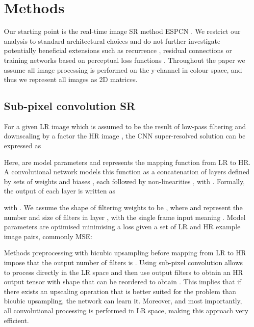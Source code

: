 \documentclass[10pt,twocolumn,letterpaper]{article}
\begin{document}
\section{Methods}

Our starting point is the real-time image \gls{SR} method ESPCN \cite{Shi2016}. We restrict our analysis to standard architectural choices and do not further investigate potentially beneficial extensions such as recurrence \cite{Kim2015a}, residual connections \cite{He2015, He2016} or training networks based on perceptual loss functions \cite{Johnson2016, Ledig2016, Bruna2016, Dosovitskiy2016}. Throughout the paper we assume all image processing is performed on the y-channel in colour space, and thus we represent all images as 2D matrices.

\subsection{Sub-pixel convolution SR}

For a given \gls{LR} image  which is assumed to be the result of low-pass filtering and downscaling by a factor  the \gls{HR} image , the \gls{CNN} super-resolved solution  can be expressed as 

Here,  are model parameters and  represents the mapping function from \gls{LR} to \gls{HR}. A convolutional network models this function as a concatenation of  layers defined by sets of weights and biases , each followed by non-linearities , with . Formally, the output of each layer is written as

with . We assume the shape of filtering weights to be , where  and  represent the number and size of filters in layer , with the single frame input meaning . Model parameters are optimised minimising a loss given a set of \gls{LR} and \gls{HR} example image pairs, commonly \gls{MSE}:


Methods preprocessing  with bicubic upsampling before mapping from \gls{LR} to \gls{HR} impose that the output number of filters is  \cite{Dong2015, Kappeler2016}. Using sub-pixel convolution allows to process  directly in the \gls{LR} space and then use  output filters to obtain an \gls{HR} output tensor with shape  that can be reordered to obtain  \cite{Shi2016}. This implies that if there exists an upscaling operation that is better suited for the problem than bicubic upsampling, the network can learn it. Moreover, and most importantly, all convolutional processing is performed in \gls{LR} space, making this approach very efficient.
\end{document}
